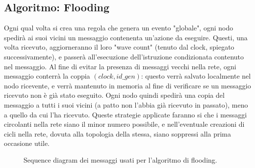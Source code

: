 \documentclass[italian]{memoir}
\begin{document}
\subsection{Algoritmo: Flooding}
Ogni qual volta si crea una regola che genera un evento "globale", ogni nodo spedirà
	   ai suoi vicini un messaggio contenenta un'azione da eseguire. Questi, una volta ricevuto,
	   aggiorneranno il loro "wave count" (tenuto dal clock, spiegato successivamente),
	   e passerà all'esecuzione dell'istruzione condizionata contenuto nel messaggio. Al
	   fine di evitar la presenza di messaggi vecchi nella rete, ogni messaggio conterrà
	   la coppia $(clock,id\_gen)$: questo verrà salvato localmente nel nodo ricevente,
	   e verrà mantenuto in memoria al fine di verificare se un messaggio ricevuto non
	   è già stato eseguito. Ogni nodo quindi spedirà una copia del messaggio a tutti
	   i suoi vicini (a patto non l'abbia già ricevuto in passato), meno a quello da cui
	   l'ha ricevuto. Queste strategie applicate faranno si che i messaggi circolanti nella
	   rete siano il minor numero possibile, e nell'eventuale creazioni di cicli nella rete,
	   dovuta alla topologia della stessa, siano soppressi alla prima occasione utile.

\begin{figure}[H]
\caption{Sequence diagram dei messaggi usati per l'algoritmo di flooding.}
\label{img:flooding}
\end{figure}
\end{document}
